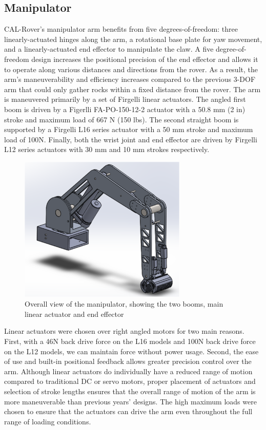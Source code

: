 \documentclass[titlepage,twocolumn,10pt]{article}
\begin{document}
    \subsection{Manipulator}
    CAL-Rover's manipulator arm benefits from five degrees-of-freedom: three linearly-actuated hinges along the arm, a rotational base plate for yaw movement, and a linearly-actuated end effector to manipulate the claw. A five degree-of-freedom design increases the positional precision of the end effector and allows it to operate along various distances and directions from the rover. As a result, the arm's maneuverability and efficiency increases compared to the previous 3-DOF arm that could only gather rocks within a fixed distance from the rover. The arm is maneuvered primarily by a set of Firgelli linear actuators. The angled first boom is driven by a Figerlli FA-PO-150-12-2 actuator with a 50.8 mm (2 in) stroke and maximum load of 667 N (150 lbs). The second straight boom is supported by a Firgelli L16 series actuator with a 50 mm stroke and maximum load of 100N. Finally, both the wrist joint and end effector are driven by Firgelli L12 series actuators with 30 mm and 10 mm strokes respectively.
     
    \begin{figure}[H]
        \centering
        \includegraphics*[width = 8cm]{images/manip.png}
        \caption{Overall view of the manipulator, showing the two booms, main linear actuator and end effector}
    \end{figure}

    Linear actuators were chosen over right angled motors for two main reasons. First, with a 46N back drive force on the L16 models and 100N back drive force on the L12 models, we can maintain force without power usage. Second, the ease of use and built-in positional feedback allows greater precision control over the arm. Although linear actuators do individually have a reduced range of motion compared to traditional DC or servo motors, proper placement of actuators and selection of stroke lengths ensures that the overall range of motion of the arm is more maneuverable than previous years' designs. The high maximum loads were chosen to ensure that the actuators can drive the arm even throughout the full range of loading conditions.
    
\end{document}
